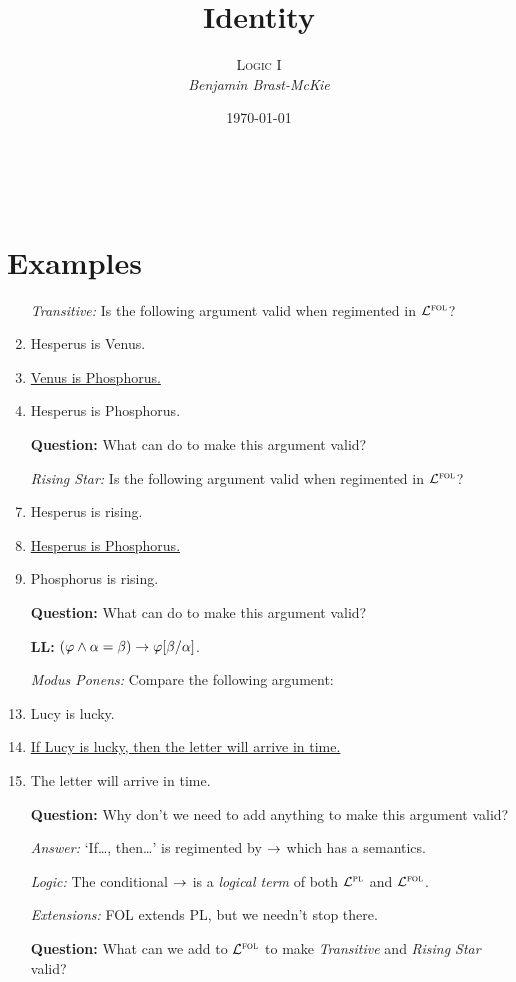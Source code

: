 \documentclass[a4paper, 11pt]{article} %
\title{\textbf{Identity}} %
\author{\textsc{Logic I}\\ \em Benjamin Brast-McKie} %
\date{\today} %
\makeatletter
\renewcommand{\maketitle}{
\begin{flushright}
{\LARGE\@title}

\vspace{10pt}

{\@author}
\\ \@date
\end{flushright}

\vspace{60pt}

}
\makeatother
\begin{document}
\maketitle %

\thispagestyle{empty}


\section*{Examples}

\begin{enumerate}
  \item[\it Transitive:] Is the following argument valid when regimented in $\mathcal{L}^{\textsc{fol}}$?
    \item Hesperus is Venus.
    \item \underline{Venus is Phosphorus.\quad\quad}
    \item Hesperus is Phosphorus.
    \item[\bf Question:] What can do to make this argument valid?
  \item[\it Rising Star:] Is the following argument valid when regimented in $\mathcal{L}^{\textsc{fol}}$?
    \setcounter{enumi}{0}
    \item Hesperus is rising.
    \item \underline{Hesperus is Phosphorus.\quad\quad}
    \item Phosphorus is rising.
    \item[\bf Question:] What can do to make this argument valid?
    \item[\bf LL:] $(\varphi \wedge \alpha = \beta) \rightarrow \varphi[\beta/\alpha]$.
  \item[\it Modus Ponens:] Compare the following argument:
    \setcounter{enumi}{0}
    \item Lucy is lucky.
    \item \underline{If Lucy is lucky, then the letter will arrive in time.\quad\quad}
    \item The letter will arrive in time.
    \item[\bf Question:] Why don't we need to add anything to make this argument valid?
    \item[\it Answer:] `If\ldots, then\ldots' is regimented by $\rightarrow$ which has a semantics. 
    \item[\it Logic:] The conditional $\rightarrow$ is a \textit{logical term} of both $\mathcal{L}^{\textsc{pl}}$ and $\mathcal{L}^{\textsc{fol}}$. 
  \item[\it Extensions:] FOL extends PL, but we needn't stop there.
  \item[\bf Question:] What can we add to $\mathcal{L}^{\textsc{fol}}$ to make \textit{Transitive} and \textit{Rising Star} valid? 
\end{enumerate}
\end{document}
